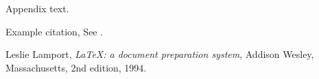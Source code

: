 \documentclass[preprint,12pt]{elsarticle}
\begin{document}
Appendix text.


Example citation, See \cite{lamport94}.




\begin{thebibliography}{00}


  Leslie Lamport,
  \textit{\LaTeX: a document preparation system},
  Addison Wesley, Massachusetts,
  2nd edition,
  1994.

\end{thebibliography}
\end{document}
